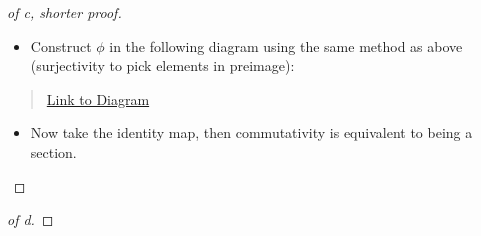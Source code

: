 \begin{solution}
\begin{proof}[of c, shorter proof]
\begin{itemize}
  \begin{itemize}
  \tightlist
  \item
    Construct \(\phi\) in the following diagram using the same method as
    above (surjectivity to pick elements in preimage):
  \end{itemize}
\end{itemize}

\begin{center}
\end{center}

\begin{quote}
\href{https://q.uiver.app/?q=WzAsNSxbMCw0LCJNIl0sWzIsNCwiTiJdLFs0LDQsIjAiXSxbMiwyLCJGIl0sWzIsMCwiWCJdLFs0LDMsIlxcaW90YSIsMCx7InN0eWxlIjp7InRhaWwiOnsibmFtZSI6Imhvb2siLCJzaWRlIjoidG9wIn19fV0sWzMsMSwiZiJdLFswLDEsIlxccGkiLDIseyJzdHlsZSI6eyJoZWFkIjp7Im5hbWUiOiJlcGkifX19XSxbMSwyXSxbMywwLCJcXGV4aXN0cyBcXHRpbGRlIFxccGhpIiwyLHsic3R5bGUiOnsiYm9keSI6eyJuYW1lIjoiZGFzaGVkIn19fV0sWzQsMCwiXFxwaGkiLDIseyJjdXJ2ZSI6NH1dXQ==}{Link
to Diagram}
\end{quote}

\begin{itemize}
\tightlist
\item
  Now take the identity map, then commutativity is equivalent to being a
  section.
\end{itemize}

\begin{center}
\end{center}

\end{proof}

\begin{proof}[of d]


\end{proof}
\end{solution}
